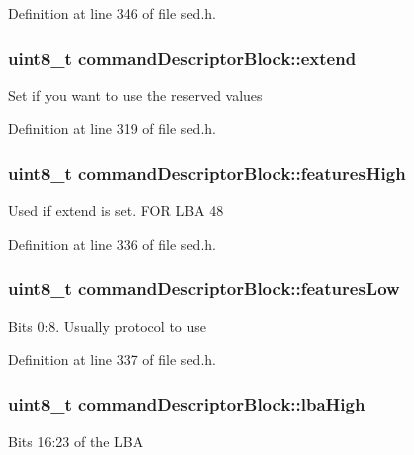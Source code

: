 Definition at line 346 of file sed.\+h.

\hypertarget{structcommandDescriptorBlock_ab4614377ec86f8cabe7b05195bf9c986}{
\subsubsection[{extend}]{\setlength{\rightskip}{0pt plus 5cm}uint8\+\_\+t command\+Descriptor\+Block\+::extend}}\label{structcommandDescriptorBlock_ab4614377ec86f8cabe7b05195bf9c986}
Set if you want to use the reserved values 

Definition at line 319 of file sed.\+h.

\hypertarget{structcommandDescriptorBlock_a5c572c996c2b2392af8a7433791b9291}{
\subsubsection[{features\+High}]{\setlength{\rightskip}{0pt plus 5cm}uint8\+\_\+t command\+Descriptor\+Block\+::features\+High}}\label{structcommandDescriptorBlock_a5c572c996c2b2392af8a7433791b9291}
Used if extend is set. F\+O\+R L\+B\+A 48 

Definition at line 336 of file sed.\+h.

\hypertarget{structcommandDescriptorBlock_abddd3964b7d29d274b01b9f76019435f}{
\subsubsection[{features\+Low}]{\setlength{\rightskip}{0pt plus 5cm}uint8\+\_\+t command\+Descriptor\+Block\+::features\+Low}}\label{structcommandDescriptorBlock_abddd3964b7d29d274b01b9f76019435f}
Bits 0\+:8. Usually protocol to use 

Definition at line 337 of file sed.\+h.

\hypertarget{structcommandDescriptorBlock_aa58b2d4228c939d16a8ba54b5e4c5d8f}{
\subsubsection[{lba\+High}]{\setlength{\rightskip}{0pt plus 5cm}uint8\+\_\+t command\+Descriptor\+Block\+::lba\+High}}\label{structcommandDescriptorBlock_aa58b2d4228c939d16a8ba54b5e4c5d8f}
Bits 16\+:23 of the L\+B\+A 

